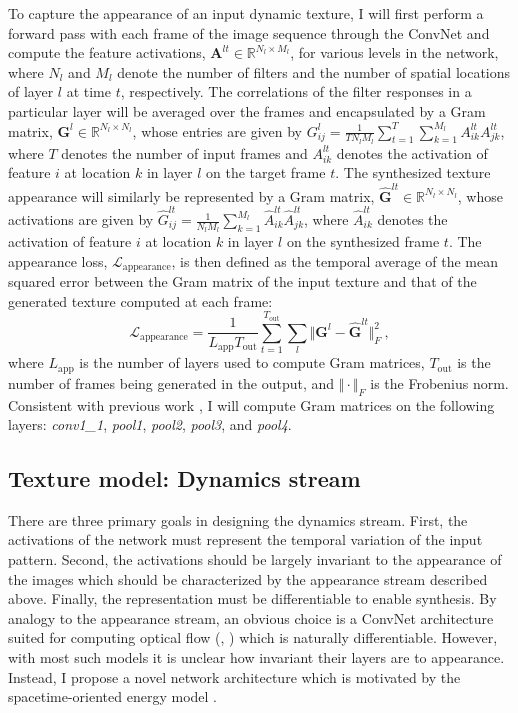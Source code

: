 To capture the appearance of an input dynamic texture, I will first
perform a forward pass with each frame of the image sequence
through the ConvNet and compute the feature activations,
$\mathbf{A}^{lt} \in \mathbb{R}^{N_l\times M_l}$, for various
levels in the network, where $N_l$ and $M_l$ denote
the number of filters and the number of spatial locations of layer
$l$ at time $t$, respectively.
The correlations of the filter responses in a particular layer will be
averaged over the frames and encapsulated by a Gram matrix,
$\mathbf{G}^{l} \in \mathbb{R}^{N_l \times N_l}$, whose
entries are given by
$G_{ij}^l = \frac{1}{T N_l M_l} \sum_{t=1}^T \sum_{k=1}^{M_l} A_{ik}^{lt} A_{jk}^{lt}$,
where $T$ denotes the number of input frames
and $A_{ik}^{lt}$ denotes the activation of feature $i$ at
location $k$ in layer $l$ on the target frame $t$.
The synthesized texture appearance will similarly be represented by a
Gram matrix, $\hat{\mathbf{G}}^{lt} \in \mathbb{R}^{N_l \times N_l}$,
whose activations are given by
$\hat{G}_{ij}^{lt} = \frac{1}{N_l M_l} \sum_{k=1}^{M_l} \hat{A}_{ik}^{lt} \hat{A}_{jk}^{lt}$,
where $\hat{A}_{ik}^{lt}$ denotes the activation of feature $i$ at
location $k$ in layer $l$ on the synthesized frame $t$.
The appearance loss, $\mathcal{L}_\text{appearance}$, is then 
defined as the temporal average of the mean squared error between
the Gram matrix of the input texture and that of the generated
texture computed at each frame:
\begin{equation}
   \mathcal{L}_\text{appearance} = \frac{1}{L_\text{app} T_\text{out}} \sum_{t=1}^{T_\text{out}} \sum_{l} \Vert \mathbf{G}^l - \hat{\mathbf{G}}^{lt} \Vert^2_F\ ,
   \label{eq:apploss}
\end{equation}
where $L_\text{app}$ is the number of layers used to compute Gram
matrices, $T_\text{out}$ is the number of frames being generated in
the output, and $\Vert \cdot \Vert_F$ is the Frobenius norm.
Consistent with previous work \cite{gatys2015}, I will compute Gram matrices on the
following layers: 
\emph{conv1\_1}, \emph{pool1}, \emph{pool2}, \emph{pool3}, and \emph{pool4}.

\subsection{Texture model: Dynamics stream}

There are three primary goals in designing the dynamics stream.
First, the activations of the network must 
represent the temporal variation of the input pattern.
Second, the activations should be largely invariant to the
appearance of the images which should be characterized
by the appearance stream described above.
Finally, the representation must be differentiable to enable 
synthesis.
By analogy to the appearance stream, an obvious choice
is a ConvNet architecture suited for computing
optical flow (\eg, \cite{dosovitskiy2015,ilg2017}) which
is naturally differentiable.
However, with most such models it is unclear how invariant
their layers are to appearance.
Instead, I propose a novel network architecture which is
motivated by the spacetime-oriented energy model
\cite{derpanis2012spacetime,simoncelli1998}.

